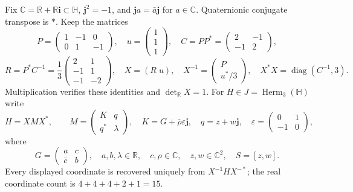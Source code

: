 Fix $\mathbb C=\mathbb R+\mathbb R\mathbf i\subset\mathbb H$,
$\mathbf j^2=-1$, and $\mathbf ja=\bar a\mathbf j$ for $a\in\mathbb C$.
Quaternionic conjugate transpose is $*$. Keep the matrices
\[
 P=\begin{pmatrix}1&-1&0\\0&1&-1\end{pmatrix},\quad
 u=\begin{pmatrix}1\\1\\1\end{pmatrix},\quad
 C=PP^*=\begin{pmatrix}2&-1\\-1&2\end{pmatrix},
\]
\[
 R=P^*C^{-1}=\frac13\begin{pmatrix}2&1\\-1&1\\-1&-2\end{pmatrix},\quad
 X=(R\;u),\quad
 X^{-1}=\begin{pmatrix}P\\u^*/3\end{pmatrix},\quad
 X^*X=\operatorname{diag}(C^{-1},3).
\]
Multiplication verifies these identities and $\det_{\mathbb R}X=1$.
For $H\in J=\operatorname{Herm}_3(\mathbb H)$ write
\begin{equation}\label{rm:marked-matrix}
 H=XMX^*,\qquad
 M=\begin{pmatrix}K&q\\q^*&\lambda\end{pmatrix},\quad
 K=G+\bar\rho\varepsilon\mathbf j,\quad q=z+w\mathbf j,
 \quad\varepsilon=\begin{pmatrix}0&1\\-1&0\end{pmatrix},
\end{equation}
where
\[
 G=\begin{pmatrix}a&c\\\bar c&b\end{pmatrix},\quad
 a,b,\lambda\in\mathbb R,\quad c,\rho\in\mathbb C,\quad
 z,w\in\mathbb C^2,\quad S=[z,w].
\]
Every displayed coordinate is recovered uniquely from $X^{-1}HX^{-*}$;
the real coordinate count is $4+4+4+2+1=15$.

